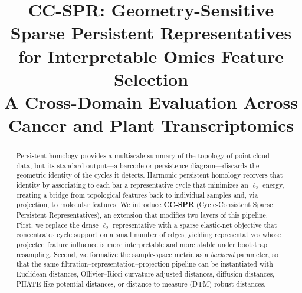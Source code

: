 \documentclass[11pt]{article}
\title{CC-SPR: Geometry-Sensitive Sparse Persistent Representatives\\for Interpretable Omics Feature Selection\\[6pt]
\large A Cross-Domain Evaluation Across Cancer and Plant Transcriptomics}
\author{}
\date{}
\begin{document}
\maketitle

\begin{abstract}
Persistent homology provides a multiscale summary of the topology of point-cloud data, but its standard output---a barcode or persistence diagram---discards the geometric identity of the cycles it detects.
Harmonic persistent homology recovers that identity by associating to each bar a representative cycle that minimizes an $\ell_2$ energy, creating a bridge from topological features back to individual samples and, via projection, to molecular features.
We introduce \textbf{CC-SPR} (Cycle-Consistent Sparse Persistent Representatives), an extension that modifies two layers of this pipeline.
First, we replace the dense $\ell_2$ representative with a sparse elastic-net objective that concentrates cycle support on a small number of edges, yielding representatives whose projected feature influence is more interpretable and more stable under bootstrap resampling.
Second, we formalize the sample-space metric as a \emph{backend} parameter, so that the same filtration--representation--projection pipeline can be instantiated with Euclidean distances, Ollivier--Ricci curvature-adjusted distances, diffusion distances, PHATE-like potential distances, or distance-to-measure (DTM) robust distances.


\end{abstract}
\end{document}

